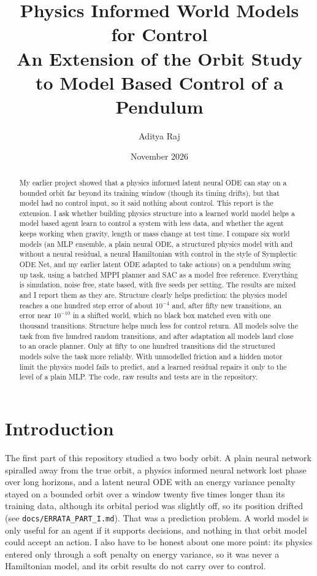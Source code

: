 \documentclass[11pt,a4paper]{article}
\title{Physics Informed World Models for Control\\[0.3em]\large An Extension of the Orbit Study to Model Based Control of a Pendulum}
\author{Aditya Raj}
\date{November 2026}
\begin{document}
\maketitle

\begin{abstract}
My earlier project showed that a physics informed latent neural ODE can stay on a bounded orbit far beyond its training window (though its timing drifts), but that model had no control input, so it said nothing about control. This report is the extension. I ask whether building physics structure into a learned world model helps a model based agent learn to control a system with less data, and whether the agent keeps working when gravity, length or mass change at test time. I compare six world models (an MLP ensemble, a plain neural ODE, a structured physics model with and without a neural residual, a neural Hamiltonian with control in the style of Symplectic ODE Net, and my earlier latent ODE adapted to take actions) on a pendulum swing up task, using a batched MPPI planner and SAC as a model free reference. Everything is simulation, noise free, state based, with five seeds per setting. The results are mixed and I report them as they are. Structure clearly helps prediction: the physics model reaches a one hundred step error of about $10^{-4}$ and, after fifty new transitions, an error near $10^{-10}$ in a shifted world, which no black box matched even with one thousand transitions. Structure helps much less for control return. All models solve the task from five hundred random transitions, and after adaptation all models land close to an oracle planner. Only at fifty to one hundred transitions did the structured models solve the task more reliably. With unmodelled friction and a hidden motor limit the physics model fails to predict, and a learned residual repairs it only to the level of a plain MLP. The code, raw results and tests are in the repository.
\end{abstract}

\tableofcontents
\newpage

\section{Introduction}
The first part of this repository studied a two body orbit. A plain neural network spiralled away from the true orbit, a physics informed neural network lost phase over long horizons, and a latent neural ODE with an energy variance penalty stayed on a bounded orbit over a window twenty five times longer than its training data, although its orbital period was slightly off, so its position drifted (see \texttt{docs/ERRATA\_PART\_I.md}). That was a prediction problem. A world model is only useful for an agent if it supports decisions, and nothing in that orbit model could accept an action. I also have to be honest about one more point: its physics entered only through a soft penalty on energy variance, so it was never a Hamiltonian model, and its orbit results do not carry over to control.
\end{document}
